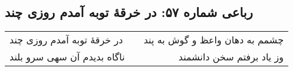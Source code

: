 \begin{center}
\section*{رباعی شماره ۵۷: در خرقهٔ توبه آمدم روزی چند}
\label{sec:057}
\begin{longtable}{l p{0.5cm} r}
در خرقهٔ توبه آمدم روزی چند
&&
چشمم به دهان واعظ و گوش به پند
\\
ناگاه بدیدم آن سهی سرو بلند
&&
وز یاد برفتم سخن دانشمند
\\
\end{longtable}
\end{center}
